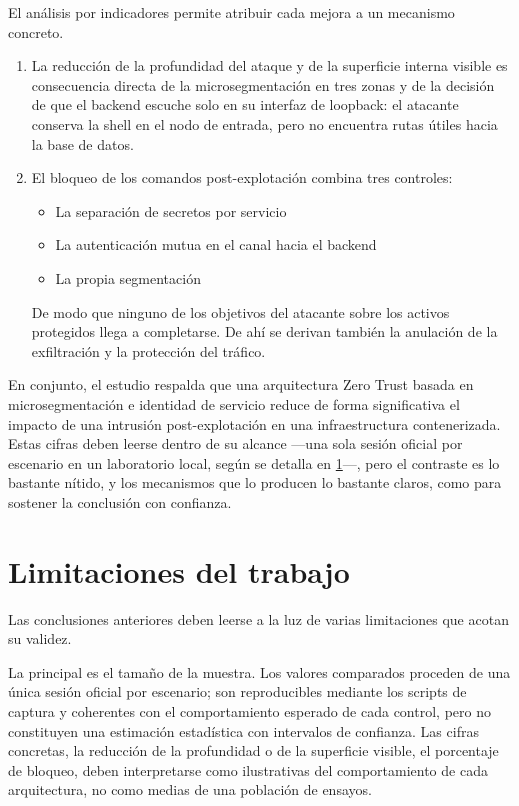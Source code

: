 \documentclass[11pt,spanish,listoffigures,listoftables]{tfgetsinf}
\begin{document}
        El análisis por indicadores permite atribuir cada mejora a un mecanismo concreto. 
        \begin{enumerate}
            \item La reducción de la profundidad del ataque y de la superficie interna visible es consecuencia directa de la microsegmentación en tres zonas y de la decisión de que el backend escuche solo en su interfaz de loopback: el atacante conserva la shell en el nodo de entrada, pero no encuentra rutas útiles hacia la base de datos. 
            \item El bloqueo de los comandos post-explotación combina tres controles: 
                \begin{itemize}
                    \item La separación de secretos por servicio
                    \item La autenticación mutua en el canal hacia el backend 
                    \item La propia segmentación
                \end{itemize}
                De modo que ninguno de los objetivos del atacante sobre los activos protegidos llega a completarse. De ahí se derivan también la anulación de la exfiltración y la protección del tráfico.
        \end{enumerate}
        En conjunto, el estudio respalda que una arquitectura Zero Trust basada en microsegmentación e identidad de servicio reduce de forma significativa el impacto de una intrusión post-explotación en una infraestructura contenerizada. Estas cifras deben leerse dentro de su alcance —una sola sesión oficial por escenario en un laboratorio local, según se detalla en \cref{sec:7.2}—, pero el contraste es lo bastante nítido, y los mecanismos que lo producen lo bastante claros, como para sostener la conclusión con confianza.

        \section{Limitaciones del trabajo}
        \label{sec:7.2}
        Las conclusiones anteriores deben leerse a la luz de varias limitaciones que acotan su validez.

        La principal es el tamaño de la muestra. Los valores comparados proceden de una única sesión oficial por escenario; son reproducibles mediante los scripts de captura y coherentes con el comportamiento esperado de cada control, pero no constituyen una estimación estadística con intervalos de confianza. Las cifras concretas, la reducción de la profundidad o de la superficie visible, el porcentaje de bloqueo, deben interpretarse como ilustrativas del comportamiento de cada arquitectura, no como medias de una población de ensayos.
\end{document}
